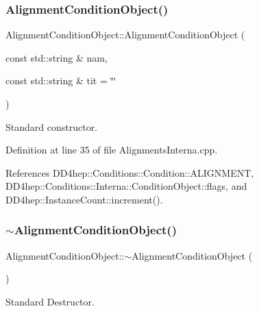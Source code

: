 \subsubsection{\texorpdfstring{Alignment\+Condition\+Object()}{AlignmentConditionObject()}}
{\footnotesize\ttfamily Alignment\+Condition\+Object\+::\+Alignment\+Condition\+Object (\begin{DoxyParamCaption}\item[{const std\+::string \&}]{nam,  }\item[{const std\+::string \&}]{tit = {\ttfamily \char`\"{}\char`\"{}} }\end{DoxyParamCaption})}



Standard constructor. 



Definition at line 35 of file Alignments\+Interna.\+cpp.



References D\+D4hep\+::\+Conditions\+::\+Condition\+::\+A\+L\+I\+G\+N\+M\+E\+NT, D\+D4hep\+::\+Conditions\+::\+Interna\+::\+Condition\+Object\+::flags, and D\+D4hep\+::\+Instance\+Count\+::increment().

\hypertarget{class_d_d4hep_1_1_alignments_1_1_interna_1_1_alignment_condition_object_abbec903201eccc7d7ff725c6b573aaa7}{}\label{class_d_d4hep_1_1_alignments_1_1_interna_1_1_alignment_condition_object_abbec903201eccc7d7ff725c6b573aaa7} 
\subsubsection{\texorpdfstring{$\sim$\+Alignment\+Condition\+Object()}{~AlignmentConditionObject()}}
{\footnotesize\ttfamily Alignment\+Condition\+Object\+::$\sim$\+Alignment\+Condition\+Object (\begin{DoxyParamCaption}{ }\end{DoxyParamCaption})\hspace{0.3cm}{\ttfamily [virtual]}}



Standard Destructor. 



